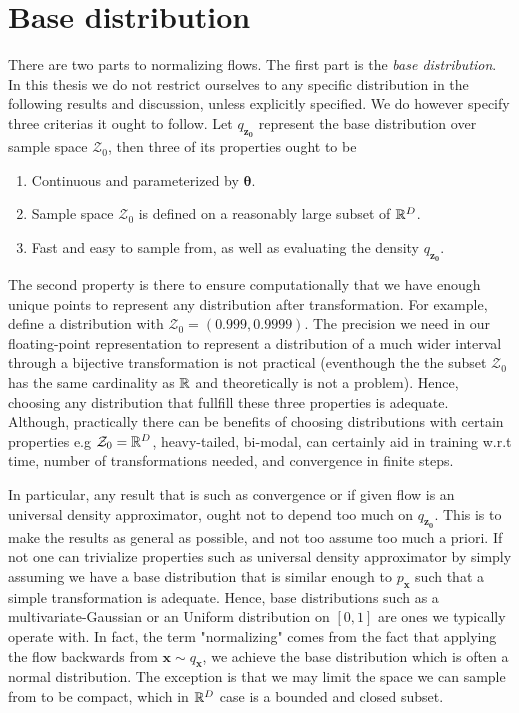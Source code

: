 \section{Base distribution}
There are two parts to normalizing flows. The first part is the \textit{base distribution}.
In this thesis we do not restrict ourselves to any specific distribution in 
the following results and discussion, unless explicitly specified.
We do however specify three criterias it ought to follow. Let \(q_{\bm{z_0}}\) represent
the base distribution over sample space \(\mathcal{Z}_0\), then three of its properties ought to be
\begin{enumerate}
    \item Continuous and parameterized by \(\bm{\theta}\).
    \item Sample space \(\mathcal{Z}_0\) is defined on a reasonably large subset of \(\mathbb{R}^D\).
    \item Fast and easy to sample from, as well as evaluating the density \(q_{\bm{z_0}}\). 
\end{enumerate}
The second property is there to ensure computationally that we have 
enough unique points to represent any distribution after transformation. For example,
define a distribution with \(\mathcal{Z}_0 = (0.999,0.9999)\). The precision we
need in our floating-point representation to represent a distribution of a much wider
interval through a bijective transformation is not practical (eventhough the the 
subset \(\mathcal{Z}_0\) has the same cardinality as \(\mathbb{R}\) and theoretically is not a problem).
Hence, choosing any distribution that fullfill these three properties is adequate. 
Although, practically there can be benefits of choosing distributions with certain 
properties e.g \(\mathcal{Z}_0 = \mathbb{R}^D\), heavy-tailed, bi-modal, can certainly aid
in training w.r.t time, number of transformations needed, and convergence in finite steps.

In particular, any result that is 
such as convergence or if given flow is an universal density approximator, ought
not to depend too much on \(q_{\bm{z_0}}\). This is to make the results as general
 as possible, and not too assume too much a priori. If not one can trivialize 
 properties such as universal density approximator by simply assuming 
 we have a base distribution that is similar enough to \(p_{\bm{x}}\) such that
a simple transformation is adequate. Hence, base distributions such as a multivariate-Gaussian or
an Uniform distribution on \([0,1]\) are ones we typically operate with. In fact,
the term "normalizing" comes from the fact that applying the flow backwards 
from \(\bm{x} \sim q_{\bm{x}}\), we achieve the base distribution which is often
a normal distribution. The exception is that we may limit the space we can sample from
to be compact, which in \(\mathbb{R}^D\) case is a bounded and closed subset. 

